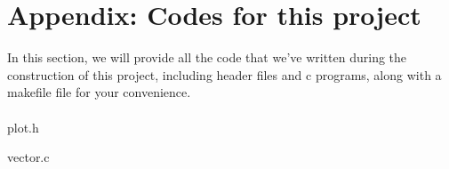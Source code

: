 \section{Appendix: Codes for this project}
In this section, we will provide all the code that we've written during the construction of this project, 
including header files and c programs, along with a makefile file for your convenience.
\\\\
plot.h

vector.c
